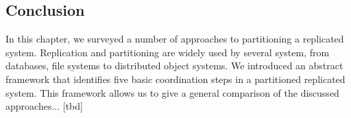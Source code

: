 




\subsection{Conclusion}

In this chapter, we surveyed a number of approaches to partitioning a replicated
system. Replication and partitioning are widely used by several system, from
databases, file systems to distributed object systems. We introduced an abstract
framework that identifies five basic coordination steps in a partitioned
replicated system. This framework allows us to give a general comparison of the
discussed approaches... [tbd]

